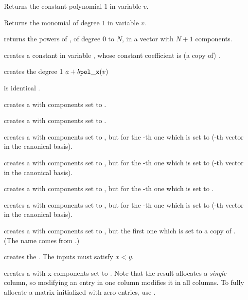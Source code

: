  Returns the constant polynomial $1$ in variable $v$.

 Returns the monomial of degree $1$ in variable $v$.

 returns the powers of
, of degree $0$ to $N$, in a vector with $N+1$ components.

 creates a constant  in variable
, whose constant coefficient is (a copy of) .

 creates the degree 1 
$a + b {\tt pol\_x}(v)$

 is identical .

 creates a  with  components set to
.

 creates a  with  components set to
.

 creates a  with  components
set to , but for the -th one which is set to 
(-th vector in the canonical basis).

 creates a  with  components
set to , but for the -th one which is set to 
(-th vector in the canonical basis).

 creates a  with 
components set to , but for the -th one which is set to
.

 creates a  with 
components set to , but for the -th one which is set to
 (-th vector in the canonical basis).

 creates a  with 
components set to , but the first one which is set to a copy
of . (The name comes from .)

\smallskip

 creates the  .
The inputs must satisfy $x < y$.

 creates a  with  x 
components set to . Note that the result allocates a
\emph{single} column, so modifying an entry in one column modifies it in
all columns. To fully allocate a matrix initialized with zero entries,
use .


